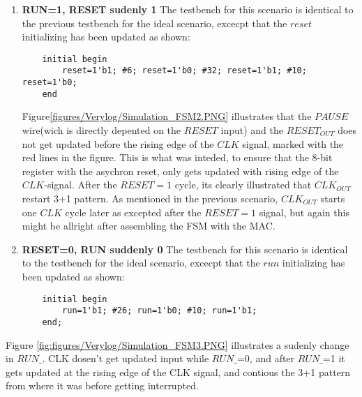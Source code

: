\begin{enumerate}
    \item \textbf{RUN=1, RESET sudenly 1}
    The testbench for this scenario is identical to the previous testbench for the ideal scenario, excecpt that the $reset$ initializing has been updated as shown:
\begin{lstlisting} 
	initial begin
		reset=1'b1; #6; reset=1'b0; #32; reset=1'b1; #10; reset=1'b0;
	end	
\end{lstlisting}
Figure\ref{figures/Verylog/Simulation_FSM2.PNG} illustrates that the $PAUSE$ wire(wich is directly depented on the $RESET$ input) and the $RESET_{OUT}$ does not get updated before the rising edge of the $CLK$ signal, marked with the red lines in the figure. This is what was inteded, to ensure that the 8-bit register with the asychron reset, only gets updated with rising edge of the $CLK$-signal. After the $RESET=1$ cycle, its clearly illustrated that $CLK_{OUT}$ restart 3+1 pattern. As mentioned in the previous scenario, $CLK_{OUT}$ starts one $CLK$ cycle later as excepted after the $RESET=1$ signal, but again this might be allright after assembling the FSM with the MAC.
\item \textbf{RESET=0, RUN suddenly 0}
    The testbench for this scenario is identical to the testbench for the ideal scenario, excecpt that the $run$ initializing has been updated as shown:
\begin{lstlisting} 
	initial begin
		run=1'b1; #26; run=1'b0; #10; run=1'b1;	
	end;
\end{lstlisting}

\end{enumerate}
Figure \ref{fig:figures/Verylog/Simulation_FSM3.PNG} illustrates a sudenly change in $RUN\_$.  CLK dosen't get updated input while $RUN\_$=0, and after $RUN\_$=1 it gets updated at the rising edge of the CLK signal, and contious the 3+1 pattern from where it was before getting interrupted. 